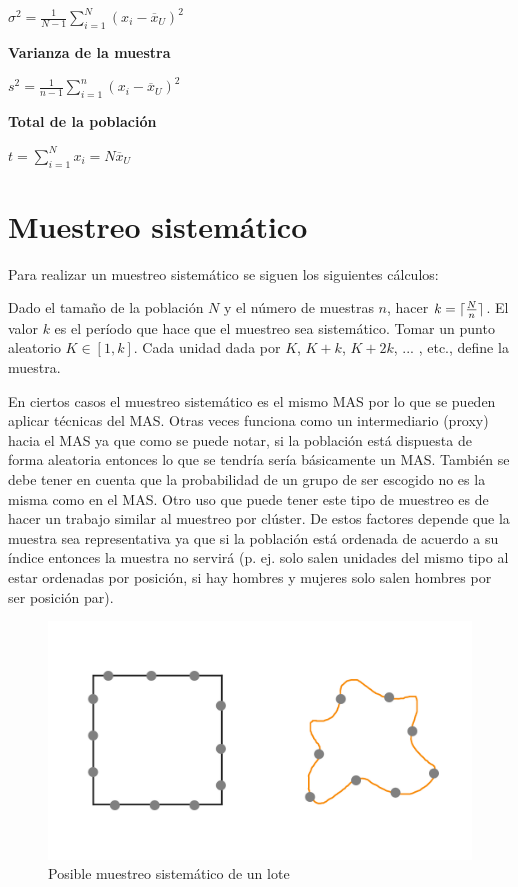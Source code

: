 \documentclass{report}
\DeclarePairedDelimiter{\ceil}{\lceil}{\rceil}
\begin{document}
\bigbreak

$\sigma^2 = \frac{1}{N-1} \sum \limits_{i=1}^{N} (x_i - \overline{x}_U)^2$


\bigbreak
\textbf{Varianza de la muestra}

\bigbreak

$s^2 = \frac{1}{n-1} \sum \limits_{i=1}^n (x_i - \overline{x}_U)^2$


\bigbreak
\textbf{Total de la población}

\bigbreak

$t = \sum \limits_{i=1}^N x_i = N \overline{x}_U$


\section{Muestreo sistemático}

Para realizar un muestreo sistemático se siguen los siguientes cálculos:

\bigbreak

Dado el tamaño de la población $N$ y el número de muestras $n$, hacer $k=\ceil{\frac{N}{n}}$. El valor $k$ es el período que hace que el muestreo sea sistemático. Tomar un punto aleatorio $K \in [1, k]$. Cada unidad dada por $K$, $K + k$, $K + 2k$, ... , etc., define la muestra.

\bigbreak

En ciertos casos el muestreo sistemático es el mismo MAS por lo que se pueden aplicar técnicas del MAS. Otras veces funciona como un intermediario (proxy) hacia el MAS ya que como se puede notar, si la población está dispuesta de forma aleatoria entonces lo que se tendría sería básicamente un MAS. También se debe tener en cuenta que la probabilidad de un grupo de ser escogido no es la misma como en el MAS. Otro uso que puede tener este tipo de muestreo es de hacer un trabajo similar al muestreo por clúster. De estos factores depende que la muestra sea representativa ya que si la población está ordenada de acuerdo a su índice entonces la muestra no servirá (p. ej. solo salen unidades del mismo tipo al estar ordenadas por posición, si hay hombres y mujeres solo salen hombres por ser posición par). 

\bigbreak

\begin{figure}[H]
    \centering
    \includegraphics[width=0.3\paperwidth]{img/soil-systematic-sampling.png}
    \caption{Posible muestreo sistemático de un lote}
\end{figure}
\end{document}
